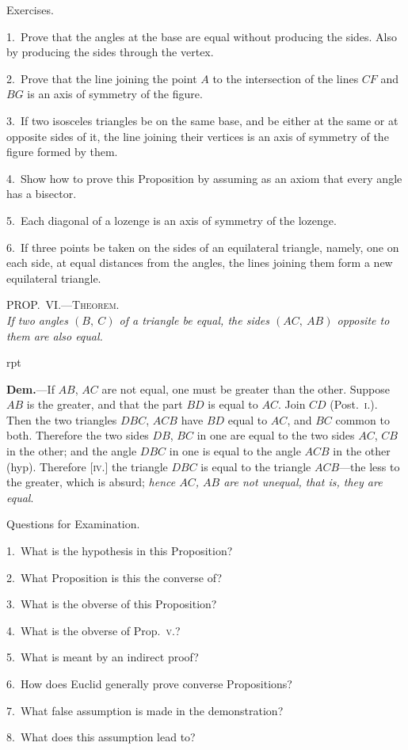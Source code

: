 \documentclass[oneside]{book}
\newcommand\myprop[2]{
\bigskip\Needspace*{4\baselineskip}\begin{center}\textsc{#1}\\\medskip\emph{#2}\par\end{center}
}
\newcommand\exhead[1]{
\Needspace*{5\baselineskip}\begin{center}
\textsf{#1}
\end{center}
}
\newcommand\imgflow[3]{
\setcounter{wrapwidth}{#1}
\begin{wrapfigure}[#2]{r}{\value{wrapwidth}pt}
\begin{center}
\vspace{-0.3in}
\end{center}
\end{wrapfigure}
}
\begin{document}
\exhead{Exercises.}

\begin{footnotesize}
1.~Prove that the angles at the base are equal without producing
the sides. Also by producing the sides through the vertex.

2.~Prove that the line joining the point $A$ to the intersection of
the lines $CF$ and $BG$ is an axis of symmetry of the figure.

3.~If two isosceles triangles be on the same base, and be either
at the same or at opposite sides of it, the line joining their vertices
is an axis of symmetry of the figure formed by them.

4.~Show how to prove this Proposition by assuming as an
axiom that every angle has a bisector.

5.~Each diagonal of a lozenge is an axis of symmetry of the
lozenge.

6.~If three points be taken on the sides of an equilateral triangle,
namely, one on each side, at equal distances from the
angles, the lines joining them form a new equilateral triangle.
\par\end{footnotesize}


\myprop{PROP\@.~VI\@.---Theorem.}{If two angles $(B,\ C)$ of a triangle be equal, the sides
$(AC,\ AB)$ opposite to them are also equal.}

\imgflow{79}{8}{f019}

\textbf{Dem.}---If $AB$, $AC$ are not equal, one must be greater
than the other. Suppose $AB$ is the
greater, and that the part $BD$ is equal
to $AC$. Join $CD$ (Post.~\textsc{i.}). Then the
two triangles $DBC$, $ACB$ have $BD$ equal
to $AC$, and $BC$ common to both. Therefore
the two sides $DB$, $BC$ in one are
equal to the two sides $AC$, $CB$ in the
other; and the angle $DBC$ in one is
equal to the angle $ACB$ in the other (hyp). Therefore
[\textsc{iv.}] the triangle $DBC$ is equal to the triangle
$ACB$---the less to the greater, which is absurd; \emph{hence
$AC$, $AB$ are not unequal, that is, they are equal}.


\exhead{Questions for Examination.}

\begin{footnotesize}
1.~What is the hypothesis in this Proposition?

2.~What Proposition is this the converse of?

3.~What is the obverse of this Proposition?

4.~What is the obverse of Prop.~\textsc{v.}?

5.~What is meant by an indirect proof?

6.~How does Euclid generally prove converse Propositions?

7.~What false assumption is made in the demonstration?

8.~What does this assumption lead to?
\par\end{footnotesize}
\end{document}

